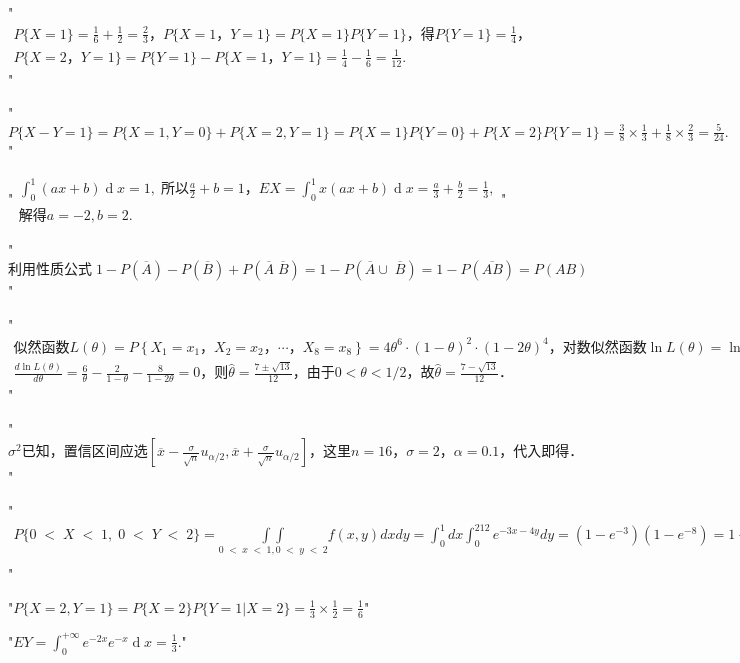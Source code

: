 "$\begin{array}{l}P\{X=1\}=\frac16+\frac12=\frac23，P\{X=1，Y=1\}=P\{X=1\}P\{Y=1\}，得P\{Y=1\}=\frac14，\\P\{X=2，Y=1\}=P\{Y=1\}-P\{X=1，Y=1\}=\frac14-\frac16=\frac1{12}.\end{array}$"


"$P\{X-Y=1\}=P\{X=1,Y=0\}+P\{X=2,Y=1\}=P\{X=1\}P\{Y=0\}+P\{X=2\}P\{Y=1\}=\frac38\times\frac13+\frac18\times\frac23=\frac5{24}.$"


"$\begin{array}{l}\int_0^1(ax+b)\operatorname dx=1,\;\mathrm{所以}\frac a2+b=1，EX=\int_0^1x(ax+b)\operatorname dx=\frac a3+\frac b2=\frac13,\\\mathrm{解得}a=-2,b=2.\end{array}$"


"$\mathrm{利用性质公式}\;1-P(\overline A)-P(\overline B)+P(\overline A\;\overline B)=1-P(\overline A\cup\;\overline B)=1-P(\overline{AB})=P(AB)$"


"$\begin{array}{l}\mathrm{似然函数}L\left(\theta\right)=P\left\{X_1=x_1，X_2=x_2，\cdots，X_8=x_8\right\}=4\theta^6\cdot\left(1-\theta\right)^2\cdot\left(1-2\theta\right)^4，\mathrm{对数似然函数}\ln L\left(\theta\right)=\ln4+6\ln\theta+2\ln\left(1-\theta\right)+4\ln\left(1-2\theta\right)，\\\frac{d\ln L\left(\theta\right)}{d\theta}=\frac6\theta-\frac2{1-\theta}-\frac8{1-2\theta}=0，\mathrm 则\widehat\theta=\frac{7\pm\sqrt{13}}{12}，\mathrm{由于}0<\theta<1/2，\mathrm 故\widehat\theta=\frac{7-\sqrt{13}}{12}．\end{array}$"


"$\sigma^2\mathrm{已知}，\mathrm{置信区间应选}\left[\overline x-\frac\sigma{\sqrt n}u_{\alpha/2},\overline x+\frac\sigma{\sqrt n}u_{\alpha/2}\right]，\mathrm{这里}n=16，\sigma=2，\alpha=0.1，\mathrm{代入即得}．$"


"$\begin{array}{l}P\{0\;<\;X\;<\;1,\;0\;<\;Y\;<\;2\}=\underset{0\;<\;x\;<\;1,0\;<\;y\;<\;2}{\int\int}f(x,y)dxdy=\int_0^1dx\int_0^212e^{-3x-4y}dy=(1-e^{-3})(1-e^{-8})=1-e^{-3}-e^{-8}+e^{-11}.\\\end{array}$"


"$P\{X=2,Y=1\}=P\{X=2\}P\{Y=1\vert X=2\}=\frac13\times\frac12=\frac16$"


"$EY=\int_0^{+\infty}e^{-2x}e^{-x}\operatorname dx=\frac13.$"



